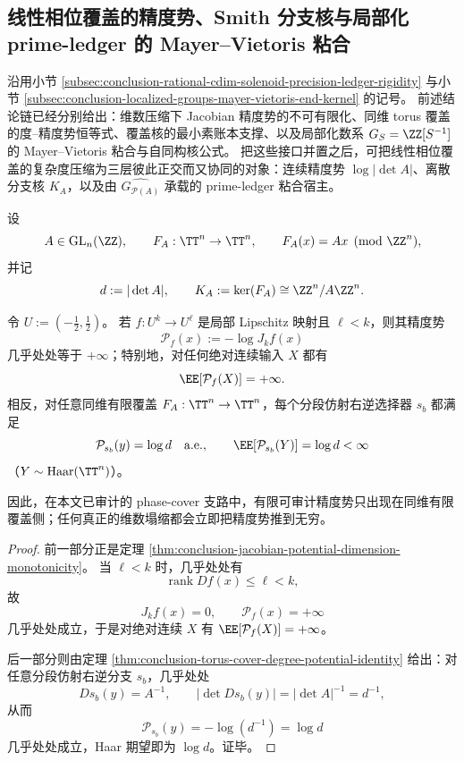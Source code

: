 \subsection{线性相位覆盖的精度势、Smith 分支核与局部化 prime-ledger 的 Mayer--Vietoris 粘合}\label{subsec:conclusion-phase-cover-smith-ledger-localization-gluing}
沿用小节 \ref{subsec:conclusion-rational-cdim-solenoid-precision-ledger-rigidity} 与小节 \ref{subsec:conclusion-localized-groups-mayer-vietoris-end-kernel} 的记号。
前述结论链已经分别给出：维数压缩下 Jacobian 精度势的不可有限化、同维 torus 覆盖的度--精度势恒等式、覆盖核的最小素账本支撑、以及局部化数系 \(G_S=\ZZ[S^{-1}]\) 的 Mayer--Vietoris 粘合与自同构核公式。
把这些接口并置之后，可把线性相位覆盖的复杂度压缩为三层彼此正交而又协同的对象：连续精度势 \(\log|\det A|\)、离散分支核 \(K_A\)，以及由 \(\widehat{G_{\mathcal P(A)}}\) 承载的 prime-ledger 粘合宿主。

设
\[
A\in \mathrm{GL}_n(\ZZ),
\qquad
F_A:\TT^n\to \TT^n,
\qquad
F_A(x)=Ax\pmod{\ZZ^n},
\]
并记
\[
d:=|\det A|,
\qquad
K_A:=\ker(F_A)\cong \ZZ^n/A\ZZ^n.
\]

\begin{theorem}[有限覆盖与维数压缩之间的精度势绝对相变]\label{thm:conclusion-phase-cover-precision-potential-phase-transition}
令 \(U:=(-\tfrac12,\tfrac12)\)。
若 \(f:U^k\to U^\ell\) 是局部 Lipschitz 映射且 \(\ell<k\)，则其精度势
\[
\mathcal P_f(x):=-\log J_k f(x)
\]
几乎处处等于 \(+\infty\)；特别地，对任何绝对连续输入 \(X\) 都有
\[
\EE[\mathcal P_f(X)]=+\infty.
\]
相反，对任意同维有限覆盖 \(F_A:\TT^n\to\TT^n\)，每个分段仿射右逆选择器 \(s_b\) 都满足
\[
\mathcal P_{s_b}(y)=\log d
\quad\text{a.e.},
\qquad
\EE[\mathcal P_{s_b}(Y)]=\log d<\infty
\]
（\(Y\sim \mathrm{Haar}(\TT^n)\)）。

因此，在本文已审计的 phase-cover 支路中，有限可审计精度势只出现在同维有限覆盖侧；任何真正的维数塌缩都会立即把精度势推到无穷。
\end{theorem}
\begin{proof}
前一部分正是定理 \ref{thm:conclusion-jacobian-potential-dimension-monotonicity}。
当 \(\ell<k\) 时，几乎处处有
\[
\operatorname{rank}Df(x)\le \ell<k,
\]
故
\[
J_k f(x)=0,
\qquad
\mathcal P_f(x)=+\infty
\]
几乎处处成立，于是对绝对连续 \(X\) 有 \(\EE[\mathcal P_f(X)]=+\infty\)。

后一部分则由定理 \ref{thm:conclusion-torus-cover-degree-potential-identity} 给出：对任意分段仿射右逆分支 \(s_b\)，几乎处处
\[
Ds_b(y)=A^{-1},
\qquad
|\det Ds_b(y)|=|\det A|^{-1}=d^{-1},
\]
从而
\[
\mathcal P_{s_b}(y)=-\log(d^{-1})=\log d
\]
几乎处处成立，Haar 期望即为 \(\log d\)。证毕。
\end{proof}

